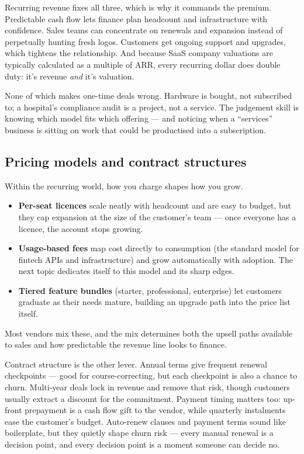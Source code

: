 Recurring revenue fixes all three, which is why it commands the premium. Predictable cash flow lets finance plan headcount and infrastructure with confidence. Sales teams can concentrate on renewals and expansion instead of perpetually hunting fresh logos. Customers get ongoing support and upgrades, which tightens the relationship. And because SaaS company valuations are typically calculated as a multiple of ARR, every recurring dollar does double duty: it's revenue \emph{and} it's valuation.


None of which makes one-time deals wrong. Hardware is bought, not subscribed to; a hospital's compliance audit is a project, not a service. The judgement skill is knowing which model fits which offering — and noticing when a ``services'' business is sitting on work that could be productised into a subscription.



\subsection{Pricing models and contract structures}


Within the recurring world, how you charge shapes how you grow.


\begin{itemize}[leftmargin=*]
\item \textbf{Per-seat licences} scale neatly with headcount and are easy to budget, but they cap expansion at the size of the customer's team — once everyone has a licence, the account stops growing.
\item \textbf{Usage-based fees} map cost directly to consumption (the standard model for fintech APIs and infrastructure) and grow automatically with adoption. The next topic dedicates itself to this model and its sharp edges.
\item \textbf{Tiered feature bundles} (starter, professional, enterprise) let customers graduate as their needs mature, building an upgrade path into the price list itself.
\end{itemize}

Most vendors mix these, and the mix determines both the upsell paths available to sales and how predictable the revenue line looks to finance.


Contract structure is the other lever. Annual terms give frequent renewal checkpoints — good for course-correcting, but each checkpoint is also a chance to churn. Multi-year deals lock in revenue and remove that risk, though customers usually extract a discount for the commitment. Payment timing matters too: up-front prepayment is a cash flow gift to the vendor, while quarterly instalments ease the customer's budget. Auto-renew clauses and payment terms sound like boilerplate, but they quietly shape churn risk — every manual renewal is a decision point, and every decision point is a moment someone can decide no.




